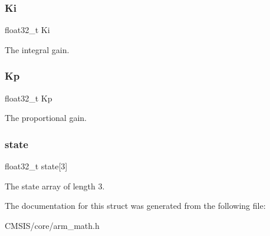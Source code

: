 \subsubsection{\texorpdfstring{Ki}{Ki}}
{\footnotesize\ttfamily float32\+\_\+t Ki}

The integral gain. \mbox{\label{structarm__pid__instance__f32_abe23f3e122ef5f55398fcf77c793c425}} 
\subsubsection{\texorpdfstring{Kp}{Kp}}
{\footnotesize\ttfamily float32\+\_\+t Kp}

The proportional gain. \mbox{\label{structarm__pid__instance__f32_a473556ac6100fc188e77930d56f51062}} 
\subsubsection{\texorpdfstring{state}{state}}
{\footnotesize\ttfamily float32\+\_\+t state\mbox{[}3\mbox{]}}

The state array of length 3. 

The documentation for this struct was generated from the following file\+:\begin{DoxyCompactItemize}
\item 
C\+M\+S\+I\+S/core/arm\+\_\+math.\+h\end{DoxyCompactItemize}
